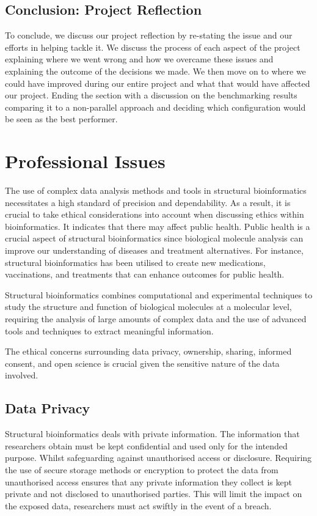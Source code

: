\documentclass[]{final_report}
\begin{document}
\subsection{Conclusion: Project Reflection}
To conclude, we discuss our project reflection by re-stating the issue and our efforts in helping tackle it. We discuss the process of each aspect of the project explaining where we went wrong and how we overcame these issues and explaining the outcome of the decisions we made. We then move on to where we could have improved during our entire project and what that would have affected our project. Ending the section with a discussion on the benchmarking results comparing it to a non-parallel approach and deciding which configuration would be seen as the best performer.

\section{Professional Issues}
The use of complex data analysis methods and tools in structural bioinformatics necessitates a high standard of precision and dependability. As a result, it is crucial to take ethical considerations into account when discussing ethics within bioinformatics. It indicates that there may affect public health. Public health is a crucial aspect of structural bioinformatics since biological molecule analysis can improve our understanding of diseases and treatment alternatives. For instance, structural bioinformatics has been utilised to create new medications, vaccinations, and treatments that can enhance outcomes for public health.

Structural bioinformatics combines computational and experimental techniques to study the structure and function of biological molecules at a molecular level, requiring the analysis of large amounts of complex data and the use of advanced tools and techniques to extract
meaningful information.

The ethical concerns surrounding data privacy, ownership, sharing, informed consent,
and open science is crucial given the sensitive nature of the data involved.

\subsection{Data Privacy}

Structural bioinformatics deals with private information. The information that researchers obtain must be kept confidential and used only for the intended purpose. Whilst safeguarding against unauthorised access or disclosure. Requiring the use of secure storage methods or encryption to protect the data from unauthorised access ensures that any private information they collect is kept private and not disclosed to unauthorised parties. This will limit the impact on the exposed data, researchers must act swiftly in the event of a breach.
\end{document}

